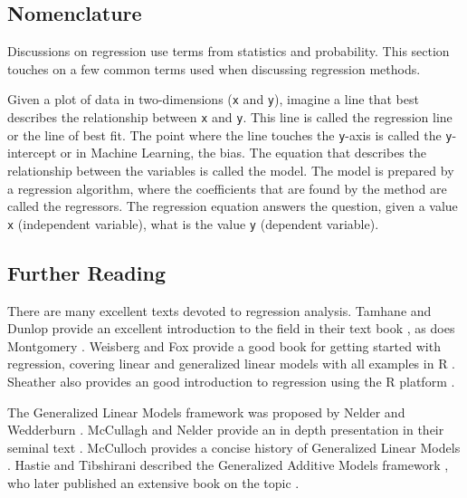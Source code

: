 \begin{bibunit}
\subsection{Nomenclature}
Discussions on regression use terms from statistics and probability. This section touches on a few common terms used when discussing regression methods.

Given a plot of data in two-dimensions (\texttt{x} and \texttt{y}), imagine a line that best describes the relationship between \texttt{x} and \texttt{y}. This line is called the regression line or the line of best fit. The point where the line touches the \texttt{y}-axis is called the \texttt{y}-intercept or in Machine Learning, the bias. The equation that describes the relationship between the variables is called the model. The model is prepared by a regression algorithm, where the coefficients that are found by the method are called the regressors. The regression equation answers the question, given a value \texttt{x} (independent variable), what is the value \texttt{y} (dependent variable).

\subsection{Further Reading}
There are many excellent texts devoted to regression analysis.
Tamhane and Dunlop provide an excellent introduction to the field in their text book \cite{Tamhane2000}, as does Montgomery \cite{Montgomery2001}.
Weisberg and Fox provide a good book for getting started with regression, covering linear and generalized linear models with all examples in R \cite{Weisberg2010}. Sheather also provides an good introduction to regression using the R platform \cite{Sheather2009}.

The Generalized Linear Models framework was proposed by Nelder and Wedderburn \cite{Nelder1972}. McCullagh and Nelder provide an in depth presentation in their seminal text \cite{McCullagh1989}. McCulloch provides a concise history of Generalized Linear Models \cite{McCulloch2000}.
Hastie and Tibshirani described the Generalized Additive Models framework \cite{Hastie1986}, who later published an extensive book on the topic \cite{Hastie1990}.

\putbib
\end{bibunit}

